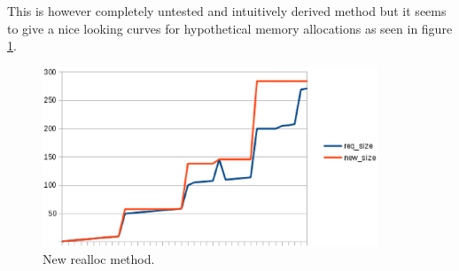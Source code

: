 This is however completely untested and intuitively derived method but it
seems to give a nice looking curves for hypothetical memory allocations as seen
in figure \ref{figure:realloc}.

\begin{figure}
  \center
  \includegraphics[width=10cm]{pics/realloc}
  \caption{New realloc method.}
  \label{figure:realloc}
\end{figure}